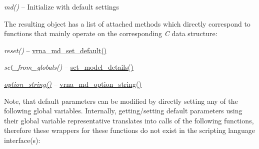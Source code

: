 \begin{DoxyRefList}
\begin{DoxyItemize}
\item {\itshape md()} -- Initialize with default settings
\end{DoxyItemize}

The resulting object has a list of attached methods which directly correspond to functions that mainly operate on the corresponding {\itshape C} data structure\+:~\newline

\begin{DoxyItemize}
\item {\itshape reset()} -- \mbox{\hyperlink{group__model__details_ga8ac6ff84936282436f822644bf841f66}{vrna\+\_\+md\+\_\+set\+\_\+default()}}
\item {\itshape set\+\_\+from\+\_\+globals()} -- \mbox{\hyperlink{group__model__details_gabad896c3650d420f3f3ddefc69e2bceb}{set\+\_\+model\+\_\+details()}}
\item {\itshape \mbox{\hyperlink{group__model__details_ga0ca65d37c515d6d36b06d3db1abb69d3}{option\+\_\+string()}}} -- \mbox{\hyperlink{group__model__details_ga3a7469f0725a849af6ba61a57dfd60ce}{vrna\+\_\+md\+\_\+option\+\_\+string()}}
\end{DoxyItemize}

Note, that default parameters can be modified by directly setting any of the following global variables. Internally, getting/setting default parameters using their global variable representative translates into calls of the following functions, therefore these wrappers for these functions do not exist in the scripting language interface(s)\+:


\end{DoxyRefList}
